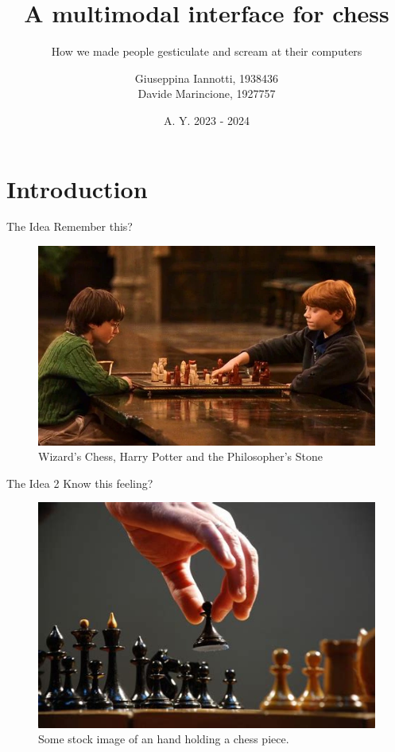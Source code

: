 \documentclass[english]{beamer}
\author{Giuseppina Iannotti, 1938436\\Davide Marincione, 1927757}
\title{A multimodal interface for chess}
\subtitle{How we made people gesticulate and scream at their computers}
\institute{Sapienza, University of Rome}
\date{A. Y. 2023 - 2024}
\begin{document}
\begin{frame}[t, plain]
\titlepage
\end{frame}

\section{Introduction}
\begin{frame}[c]{The Idea}
    Remember this?
    \begin{figure}
        \centering
        \includegraphics[width=.85\textwidth]{images/wizard_chess.png}
        \caption{Wizard's Chess, Harry Potter and the Philosopher's Stone}
    \end{figure}
\end{frame}

\begin{frame}[c]{The Idea 2}
    Know this feeling?
    \begin{figure}
        \centering
        \includegraphics[width=.7\textwidth]{images/stock_hand.jpeg}
        \caption{Some stock image of an hand holding a chess piece.}
    \end{figure}
\end{frame}
\end{document}
